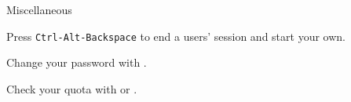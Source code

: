 \begin{block}{Miscellaneous}
  \begin{indented_itemize}
  \item Press \texttt{Ctrl-Alt-Backspace} to end a users' session and start your own.
  \item Change your password with .
  \item Check your quota with  or .
  \end{indented_itemize}
\end{block}
